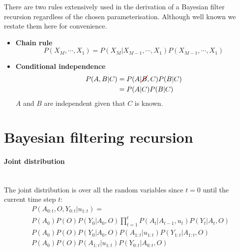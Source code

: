 \begin{appendices}
There are two rules extensively used in the derivation of a Bayesian filter recursion regardless 
of the chosen parameterisation. Although well known we restate them here for convenience.

\begin{itemize}
 \item \textbf{Chain rule}\\
 \begin{equation}
  P(X_M,\cdots,X_1) = P(X_M|X_{M-1},\cdots,X_1) P(X_{M-1},\cdots,X_1) \label{eq:ch5:chain_rule}
 \end{equation}
 \item \textbf{Conditional independence}\\
  \begin{align}
    P(A,B|C) &= P(A|\Ccancel[red]{B},C) P(B|C) \nonumber \\
             &= P(A|C) P(B|C)
  \end{align}
  $A$ and $B$ are independent given that $C$ is known.
\end{itemize}


\section{Bayesian filtering recursion}\label{appendix:bayes_recursion}

\paragraph{Joint distribution}\\

The joint distribution is over all the random variables since $t=0$ until the current 
time step $t$:
\begin{align}
 &P(A_{0:t},O,Y_{0:t}|u_{1:t}) =\nonumber \\ 
 &P(A_0)P(O)P(Y_0|A_0,O)\prod_{t=1}^t P(A_t|A_{t-1},u_{t}) P(Y_t|A_t,O) \label{eq:ch5:app:joint} \\
 &P(A_0)P(O)P(Y_0|A_0,O) P(A_{1:t}|u_{1:t}) P(Y_{1:t}|A_{1:t},O)  \label{eq:ch5:app:joint_2} \\
 &P(A_0)P(O) P(A_{1:t}|u_{1:t}) P(Y_{0:t}|A_{0:t},O) \label{eq:ch5:joint_final}
\end{align}


\end{appendices}
